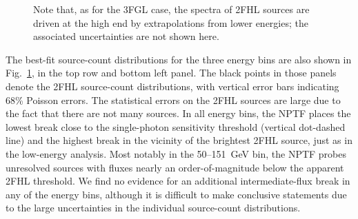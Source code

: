 \begin{figure}[!phtb]
{   Note that, as for the 3FGL case, the spectra of 2FHL sources are driven at the high end by extrapolations from lower energies; the associated uncertainties are not shown here. }
   \label{fig:dndsdata_HE}
\end{figure}

The best-fit source-count distributions for the three energy bins are also shown in Fig.~\ref{fig:dndsdata_HE}, in the top row and bottom left panel.  The black points in those panels denote the 2FHL source-count distributions, with vertical error bars indicating 68\% Poisson errors.  The statistical errors on the 2FHL sources are large due to the fact that there are not many sources.  In all energy bins, the NPTF places the lowest break close to the single-photon sensitivity threshold (vertical dot-dashed line) and the highest break in the vicinity of the brightest 2FHL source, just as in the low-energy analysis.  Most notably in the 50--151~GeV bin, the NPTF probes unresolved sources with fluxes nearly an order-of-magnitude below the apparent 2FHL threshold.  We find no evidence for an additional intermediate-flux break in any of the energy bins, although it is difficult to make conclusive statements due to the large uncertainties in the individual source-count distributions. 

